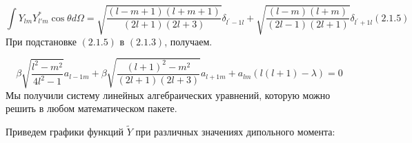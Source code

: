 \documentclass[a4paper]{article}
\begin{document}
\begin{equation*}
\int Y_{\mathit{lm}}Y_{l'm}^{\ast }\cos \theta \mathit{d\Omega
}=\sqrt{\frac{(l-m+1)(l+m+1)}{\left(2l+1\right)(2l+3)}}\delta
_{l^{'}-1l}+\sqrt{\frac{(l-m)(l+m)}{\left(2l-1\right)(2l+1)}}\delta _{l^{'}+1l}(2.1.5)
\end{equation*}
При подстановке  $(2.1.5)$ в 
$(2.1.3)$, получаем.

\begin{equation*}
\beta \sqrt{\frac{l^2-m^2}{4l^2-1}}a_{l-1m}+\beta
\sqrt{\frac{\left(l+1\right)^2-m^2}{\left(2l+1\right)(2l+3)}}a_{l+1m}+a_{\mathit{lm}}\left(l\left(l+1\right)-\lambda
\right)=0
\end{equation*}
Мы получили систему линейных алгебраических уравнений, которую можно решить в любом математическом пакете.

Приведем графики
функций  $\widetilde Y$ при
различных значениях дипольного момента:
\end{document}
